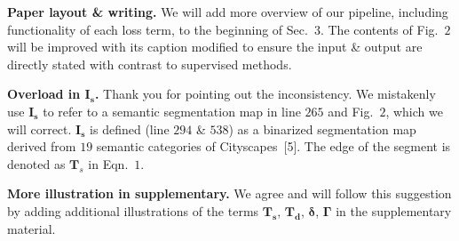 \documentclass[10pt,twocolumn,letterpaper]{article}
\newcommand{\Paragraph}[1]{\vspace{0.40mm} \noindent \textbf{#1} \hspace{0mm}}
\begin{document}
\Paragraph{Paper layout \& writing.} 
We will add more overview of our pipeline, including functionality of each loss term, to the beginning of Sec.~$3$. 
The contents of Fig.~$2$ will be improved with its caption modified to ensure the input \& output are directly stated with contrast to supervised methods. 

\Paragraph{Overload in $\mathbf{I_s}$.} 
Thank you for pointing out the inconsistency. 
We mistakenly use $\mathbf{I_s}$ to refer to a semantic segmentation map in line $265$ and Fig.~$2$, which we will correct. 
$\mathbf{I_s}$ is defined (line $294$ \& $538$) as a binarized segmentation map derived from $19$ semantic categories of Cityscapes~[5].
The edge of the segment is denoted as $\mathbf{T}_s$ in Eqn.~$1$.

\Paragraph{More illustration in supplementary.} 
We agree and will follow this suggestion by adding additional illustrations of the terms $\mathbf{T_s}$, $\mathbf{T_d}$, $\mathbf{\delta}$, $\mathbf{\Gamma}$ in the supplementary material.
\end{document}
